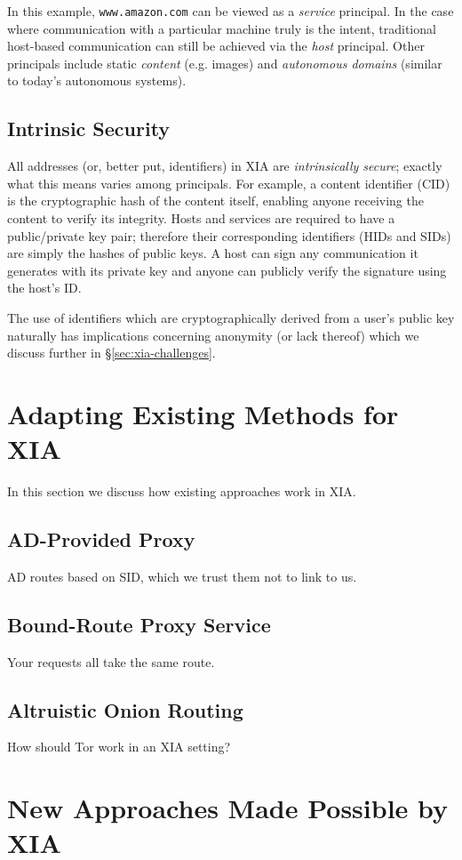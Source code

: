 \documentclass{article}
\begin{document}
In this example, \texttt{www.amazon.com} can be viewed as a \emph{service} principal. In the case where communication with a particular machine truly is the intent, traditional host-based communication can still be achieved via the \emph{host} principal. Other principals include static \emph{content} (e.g. images) and \emph{autonomous domains} (similar to today's autonomous systems).
\subsection{Intrinsic Security}
All addresses (or, better put, identifiers) in XIA are \emph{intrinsically secure}; exactly what this means varies among principals. For example, a content identifier (CID) is the cryptographic hash of the content itself, enabling anyone receiving the content to verify its integrity. Hosts and services are required to have a public/private key pair; therefore their corresponding identifiers (HIDs and SIDs) are simply the hashes of public keys. A host can sign any communication it generates with its private key and anyone can publicly verify the signature using the host's ID.

The use of identifiers which are cryptographically derived from a user's public key naturally has implications concerning anonymity (or lack thereof) which we discuss further in \S\ref{sec:xia-challenges}.


\section{Adapting Existing Methods for XIA}
In this section we discuss how existing approaches work in XIA.
\subsection{AD-Provided Proxy}
AD routes based on SID, which we trust them not to link to us.
\subsection{Bound-Route Proxy Service}
Your requests all take the same route.
\subsection{Altruistic Onion Routing}
How should Tor work in an XIA setting?


\section{New Approaches Made Possible by XIA}
\end{document}

